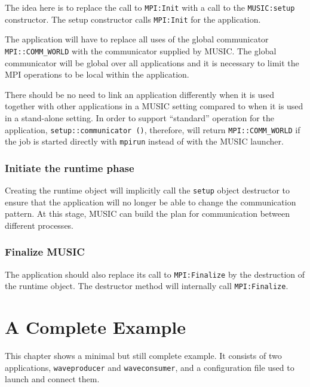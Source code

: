 \documentclass[a4paper,twoside]{report}
\begin{document}
The idea here is to replace the call to \lstinline|MPI:Init| with a
call to the \lstinline|MUSIC:setup| constructor.  The setup
constructor calls \lstinline|MPI:Init| for the application.

The application will have to replace all uses of the global
communicator \lstinline|MPI::COMM_WORLD| with the communicator
supplied by MUSIC.  The global communicator will be global over all
applications and it is necessary to limit the MPI operations to be
local within the application.

There should be no need to link an application differently when it is
used together with other applications in a MUSIC setting compared to
when it is used in a stand-alone setting.  In order to support
``standard'' operation for the application,
\lstinline|setup::communicator ()|, therefore, will return
\lstinline|MPI::COMM_WORLD| if the job is started directly with
\lstinline|mpirun| instead of with the MUSIC launcher.



\subsection{Initiate the runtime phase}

Creating the runtime object will implicitly call the \lstinline|setup|
object destructor to ensure that the application will no longer be
able to change the communication pattern.  At this stage, MUSIC can
build the plan for communication between different processes.

\subsection{Finalize MUSIC}

The application should also replace its call to
\lstinline|MPI:Finalize| by the destruction of the runtime object.
The destructor method will internally call \lstinline|MPI:Finalize|.




\appendix

\chapter{A Complete Example}

This chapter shows a minimal but still complete example.  It consists
of two applications, \texttt{waveproducer} and \texttt{waveconsumer},
and a configuration file used to launch and connect them.
\end{document}
